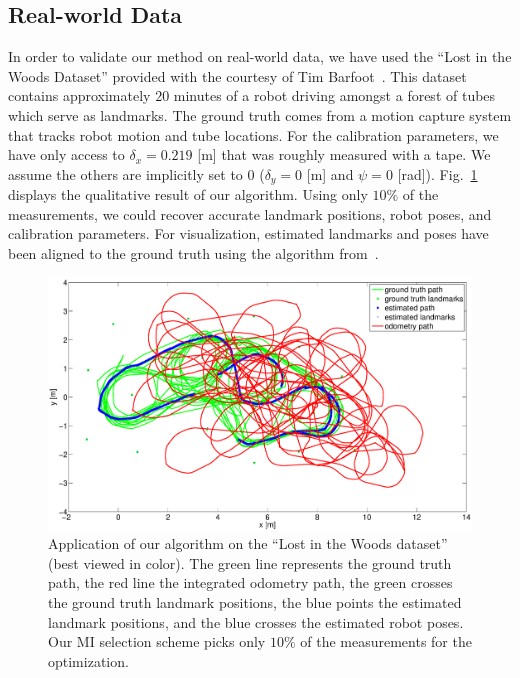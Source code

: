 \subsection{Real-world Data}

In order to validate our method on real-world data, we have used the ``Lost in
the Woods Dataset'' provided with the courtesy of Tim
Barfoot~\cite{tong12gaussian}. This dataset contains approximately $20$ minutes
of a robot driving amongst a forest of tubes which serve as landmarks. The
ground truth comes from a motion capture system that tracks robot motion and
tube locations. For the calibration parameters, we have only access to
$\delta_x=0.219$ [m] that was roughly measured with a tape. We assume the others
are implicitly set to $0$ ($\delta_y=0$ [m] and $\psi=0$ [rad]).
Fig.~\ref{fig:dataset2-path-result} displays the qualitative result of our
algorithm. Using only $10\%$ of the measurements, we could recover accurate
landmark positions, robot poses, and calibration parameters. For visualization,
estimated landmarks and poses have
been aligned to the ground truth using the algorithm
from~\cite{fiore01efficient}.

\begin{figure}[t]
\centering
\includegraphics[width=\columnwidth]{fig/dataset2-path-result.eps}
\caption{Application of our algorithm on the ``Lost in the Woods dataset''
  (best viewed in color). The
  green line represents the ground truth path, the red line the integrated
  odometry path, the green crosses the ground truth landmark positions, the blue
  points the estimated landmark positions, and the blue crosses the estimated
  robot poses. Our MI selection scheme picks only $10\%$ of the measurements
  for the optimization.}
\label{fig:dataset2-path-result}
\end{figure}

